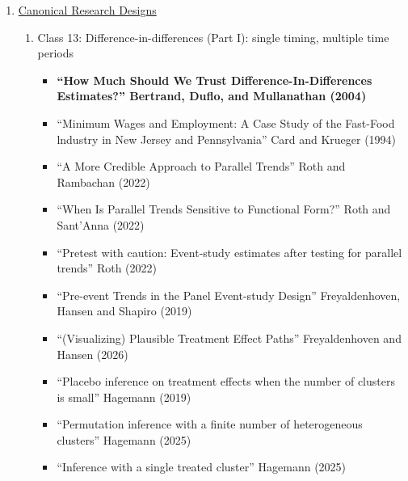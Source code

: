 \documentclass[11pt, a4paper]{article}
\begin{document}
\begin{enumerate}
\begin{enumerate}
\begin{itemize}
    \item \textbf{``Understanding the average impact of microcredit expansions: A bayesian hierarchical analysis of seven randomized experiments'' Meager (2019)}
    \item ``Investing for the Long Run when Returns Are Predictable.'' Barberis (2000)
    \item ``Is there a replication crisis in finance?'' Jensen, Kelly and Pedersen (2021)
      \item ``SI 2022 Methods Lectures - Empirical Bayes Methods, Theory and Application'', Gu and Walters (2022) \url{https://www.nber.org/conferences/si-2022-methods-lectures-empirical-bayes-methods-theory-and-application}
    \end{itemize}
  \end{enumerate}
\item  \underline{Canonical Research Designs}
  \begin{enumerate}
  \item Class 13: Difference-in-differences (Part I): single timing, multiple time periods
    \begin{itemize}
    \item \textbf{``How Much Should We Trust  Difference-In-Differences Estimates?'' Bertrand, Duflo, and Mullanathan (2004)}
    \item ``Minimum Wages and Employment: A Case Study of the Fast-Food lndustry in New Jersey and Pennsylvania'' Card and Krueger (1994)
    \item ``A More Credible Approach to Parallel Trends'' Roth and Rambachan (2022)
    \item ``When Is Parallel Trends Sensitive to Functional Form?'' Roth and Sant'Anna (2022)
    \item ``Pretest with caution: Event-study estimates after testing for parallel trends'' Roth (2022)
    \item ``Pre-event Trends in the Panel Event-study Design'' Freyaldenhoven, Hansen and Shapiro (2019)
    \item ``(Visualizing) Plausible Treatment Effect Paths'' Freyaldenhoven and Hansen (2026)
    \item ``Placebo inference on treatment effects when the number of clusters is small'' Hagemann (2019)
    \item ``Permutation inference with a finite number of heterogeneous clusters'' Hagemann (2025)
    \item ``Inference with a single treated cluster'' Hagemann (2025)
    \end{itemize}

\end{enumerate}
\end{enumerate}
\end{document}
